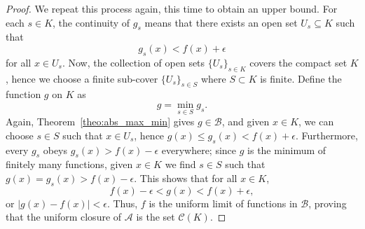 \documentclass[11pt]{article}
\theoremstyle{definition}
\theoremstyle{remark}
\begin{document}
\begin{proof}
        We repeat this process again, this time to obtain an upper bound. For each $s
        \in K$, the continuity of $g_s$ means that there exists an open set $U_s
        \subseteq K$ such that \[
            g_s(x) < f(x) + \epsilon
        \] for all $x \in U_s$. Now, the collection of open sets $\{U_s\}_{s \in K}$
        covers the compact set $K$, hence we choose a finite sub-cover $\{U_s\}_{s
        \in S}$ where $S \subset K$ is finite. Define the function $g$ on $K$ as \[
            g = \min_{s \in S} g_s.
        \] Again, Theorem~\ref{theo:abs_max_min} gives $g \in \mathscr{B}$, and given
        $x \in K$, we can choose $s \in S$ such that $x \in U_s$, hence $g(x) \leq
        g_s(x) < f(x) + \epsilon$. Furthermore, every $g_s$ obeys $g_s(x) > f(x) -
        \epsilon$ everywhere; since $g$ is the minimum of finitely many functions,
        given $x \in K$ we find $s \in S$ such that $g(x) = g_s(x) > f(x) -
        \epsilon$. This shows that for all $x \in K$, \[
            f(x) - \epsilon < g(x) < f(x) + \epsilon,
        \] or $|g(x) - f(x)| < \epsilon$. Thus, $f$ is the uniform limit of functions
        in $\mathscr{B}$, proving that the uniform closure of $\mathscr{A}$ is the
        set $\mathscr{C}(K)$.
    \end{proof}
\end{document}
